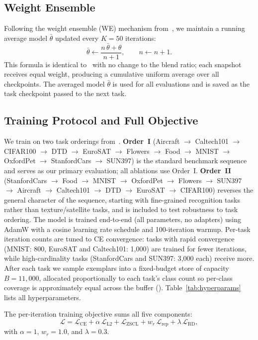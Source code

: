 \documentclass{article}
\begin{document}
  \subsection{Weight Ensemble}
  Following the weight ensemble (WE) mechanism from~\citet{zheng2023zscl}, we
  maintain a running average model $\bar{\theta}$ updated every $K{=}50$
  iterations:
  \begin{equation}
    \bar{\theta} \leftarrow \frac{n\,\bar{\theta} + \theta}{n + 1}, \qquad
    n \leftarrow n + 1.
  \end{equation}
  This formula is identical to~\citet{zheng2023zscl} with no change to the blend ratio; each snapshot receives equal weight, producing a cumulative uniform average over all checkpoints. The averaged model $\bar{\theta}$ is used for all evaluations and is saved as
  the task checkpoint passed to the next task.

  \subsection{Training Protocol and Full Objective}
  We train on two task orderings from~\citet{zheng2023zscl}. \textbf{Order~I}
  (Aircraft $\to$ Caltech101 $\to$ CIFAR100 $\to$ DTD $\to$ EuroSAT $\to$
  Flowers $\to$ Food $\to$ MNIST $\to$ OxfordPet $\to$ StanfordCars $\to$
  SUN397) is the standard benchmark sequence and serves as our primary evaluation;
  all ablations use Order~I. \textbf{Order~II} (StanfordCars $\to$ Food $\to$
  MNIST $\to$ OxfordPet $\to$ Flowers $\to$ SUN397 $\to$ Aircraft $\to$
  Caltech101 $\to$ DTD $\to$ EuroSAT $\to$ CIFAR100) reverses the general
  character of the sequence, starting with fine-grained recognition tasks rather
  than texture/satellite tasks, and is included to test robustness to task
  ordering. The model is trained end-to-end
  (all parameters, no adapters) using AdamW with a cosine learning rate schedule
  and 100-iteration warmup. Per-task iteration counts are tuned to CE convergence:
  tasks with rapid convergence (MNIST: 800, EuroSAT and Caltech101: 1{,}000) are
  trained for fewer iterations, while high-cardinality tasks (StanfordCars and
  SUN397: 3{,}000 each) receive more. After each task we sample exemplars into a
  fixed-budget store of capacity $B{=}11{,}000$, allocated proportionally to each
  task's class count so per-class coverage is approximately equal across the buffer
  (). Table~\ref{tab:hyperparams} lists all hyperparameters.

  The per-iteration training objective sums all five components:
  \begin{equation}
    \mathcal{L} = \mathcal{L}_{\text{CE}}
                + \alpha\,\mathcal{L}_{\text{L2}}
                + \mathcal{L}_{\text{ZSCL}}
                + w_r\,\mathcal{L}_{\text{rep}}
                + \lambda\,\mathcal{L}_{\text{RD}},
    \label{eq:total}
  \end{equation}
  \noindent with $\alpha{=}1$, $w_r{=}1.0$, and $\lambda{=}0.3$.
\end{document}
